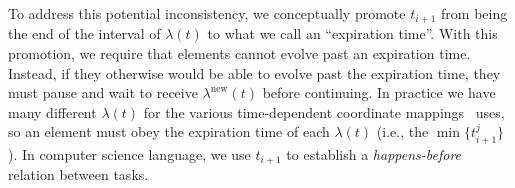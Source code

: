 \begin{bibunit}[unsrtnat]
To address this potential inconsistency, we conceptually promote $t_{i+1}$ from
being the end of the interval of $\lambda(t)$ to what we call an ``expiration
time''. With this promotion, we require that elements cannot evolve past an
expiration time. Instead, if they otherwise would be able to evolve past the
expiration time, they must pause and wait to receive $\lambda^\mathrm{new}(t)$
before continuing. In practice we have many different $\lambda(t)$ for the
various time-dependent coordinate mappings \spectre~uses, so an element must
obey the expiration time of each $\lambda(t)$ (i.e., the $\min\{t^j_{i+1}\}$).
In computer science language, we use $t_{i+1}$ to establish a
\textit{happens-before} relation between tasks.

\begin{figure}
\end{figure}
\end{bibunit}
